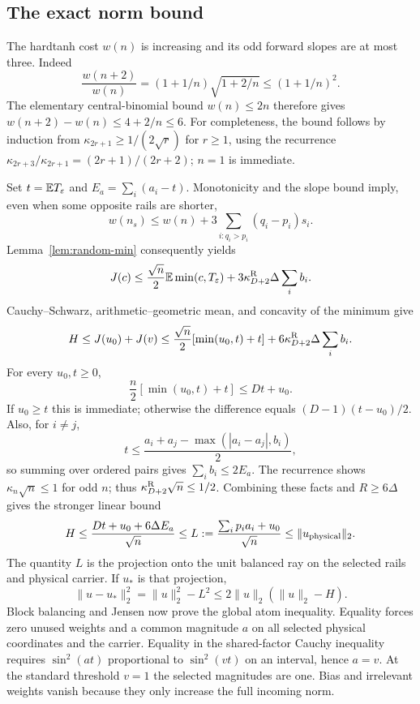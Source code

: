 \subsection{The exact norm bound}

The hardtanh cost $w(n)$ is increasing and its odd forward slopes are
at most three. Indeed
\[
 \frac{w(n+2)}{w(n)}=(1+1/n)\sqrt{1+2/n}\le(1+1/n)^2.
\]
The elementary central-binomial bound $w(n)\le2n$ therefore gives
$w(n+2)-w(n)\le4+2/n\le6$.
For completeness, the bound follows by induction from
$\kappa_{2r+1}\ge1/(2\sqrt r)$ for $r\ge1$, using the recurrence
$\kappa_{2r+3}/\kappa_{2r+1}=(2r+1)/(2r+2)$; $n=1$ is immediate.

Set $t=\mathbb E T_\varepsilon$ and $E_a=\sum_i(a_i-t)$. Monotonicity and
the slope bound imply, even when some opposite rails are shorter,
\[
 w(n_s)\le w(n)+3\sum_{i:q_i>p_i}(q_i-p_i)s_i.
\]
Lemma~\ref{lem:random-min} consequently yields
\[
 J(c)\le\frac{\sqrt n}{2}\mathbb E\min(c,T_\varepsilon)
       +3\kappa_{D+2}^{\rm R}\Delta\sum_i b_i.
\]
Cauchy--Schwarz, arithmetic--geometric mean, and concavity of the
minimum give
\[
 H\le J(u_0)+J(v)
 \le\frac{\sqrt n}{2}[\min(u_0,t)+t]
       +6\kappa_{D+2}^{\rm R}\Delta\sum_i b_i.
\]
For every $u_0,t\ge0$,
\[
 \frac n2[\min(u_0,t)+t]\le Dt+u_0.
\]
If $u_0\ge t$ this is immediate; otherwise the difference equals
$(D-1)(t-u_0)/2$. Also, for $i\ne j$,
\[
 t\le\frac{a_i+a_j-\max(|a_i-a_j|,b_i)}2,
\]
so summing over ordered pairs gives $\sum_i b_i\le2E_a$.
The recurrence shows $\kappa_n\sqrt n\le1$ for odd $n$; thus
$\kappa_{D+2}^{\rm R}\sqrt n\le1/2$. Combining these facts and
$R\ge6\Delta$ gives the stronger linear bound
\begin{equation}\label{eq:projection-bound}
 H\le\frac{Dt+u_0+6\Delta E_a}{\sqrt n}
 \le L:=\frac{\sum_i p_i a_i+u_0}{\sqrt n}
 \le\|u_{\rm physical}\|_2.
\end{equation}
The quantity $L$ is the projection onto the unit balanced ray on the
selected rails and physical carrier. If $u_*$ is that projection,
\begin{equation}\label{eq:balanced-distance}
 \|u-u_*\|_2^2=\|u\|_2^2-L^2
 \le2\|u\|_2(\|u\|_2-H).
\end{equation}
Block balancing and Jensen now prove the global atom inequality.
Equality forces zero unused weights and a common magnitude $a$ on
all selected physical coordinates and the carrier. Equality in the
shared-factor Cauchy inequality requires $\sin^2(at)$ proportional
to $\sin^2(vt)$ on an interval, hence $a=v$. At the standard threshold
$v=1$ the selected magnitudes are one. Bias and irrelevant weights
vanish because they only increase the full incoming norm.

